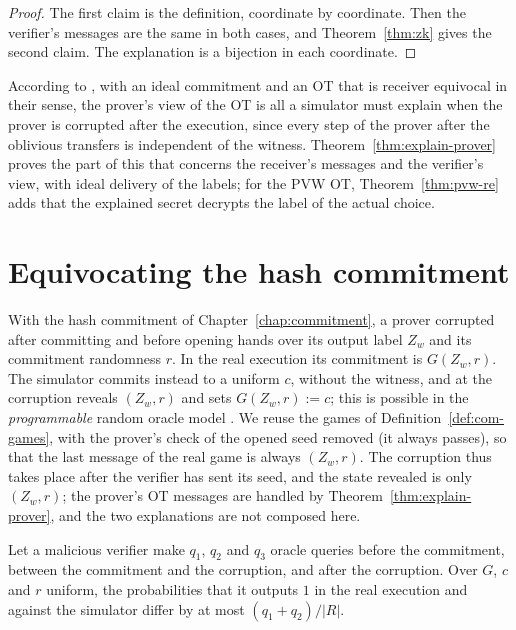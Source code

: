 \begin{proof}
  \leanok
  The first claim is the definition, coordinate by coordinate. Then the verifier's messages are the
  same in both cases, and Theorem~\ref{thm:zk} gives the second claim. The explanation is a
  bijection in each coordinate.
\end{proof}

According to \cite[Sect.~3.2]{GKPS18}, with an ideal commitment and an OT that is receiver
equivocal in their sense, the prover's view of the OT is all a simulator must explain when the
prover is corrupted after the execution, since every step of the prover after the oblivious
transfers is independent of the witness. Theorem~\ref{thm:explain-prover} proves the part of this
that concerns the receiver's messages and the verifier's view, with ideal delivery of the labels;
for the PVW OT, Theorem~\ref{thm:pvw-re} adds that the explained secret decrypts the label of the
actual choice.

\section{Equivocating the hash commitment}

With the hash commitment of Chapter~\ref{chap:commitment}, a prover corrupted after committing and
before opening hands over its output label $Z_w$ and its commitment randomness $r$. In the real
execution its commitment is $G(Z_w, r)$. The simulator commits instead to a uniform $c$, without the
witness, and at the corruption reveals $(Z_w, r)$ and sets $G(Z_w, r) := c$; this is possible in
the \emph{programmable} random oracle model \cite[Sect.~1.2]{GKPS18}. We reuse the games of
Definition~\ref{def:com-games}, with the prover's check of the opened seed removed (it always
passes), so that the last message of the real game is always $(Z_w, r)$. The corruption thus takes
place after the verifier has sent its seed, and the state revealed is only $(Z_w, r)$; the prover's
OT messages are handled by Theorem~\ref{thm:explain-prover}, and the two explanations are not
composed here.

\begin{theorem}
  \label{thm:equivocate-rom}
  \leanok
  Let a malicious verifier make $q_1$, $q_2$ and $q_3$ oracle queries before the commitment,
  between the commitment and the corruption, and after the corruption. Over $G$, $c$ and $r$
  uniform, the probabilities that it outputs $1$ in the real execution and against the simulator
  differ by at most $(q_1 + q_2)/|R|$.
\end{theorem}

